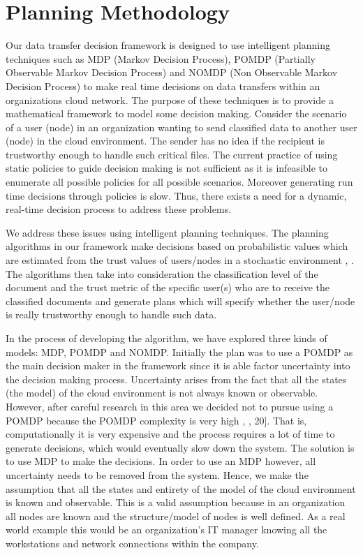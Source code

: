 \section{Planning Methodology}
Our data transfer decision framework is designed to use intelligent planning
techniques such as MDP (Markov Decision Process), POMDP (Partially Observable
Markov Decision Process) and NOMDP (Non Observable Markov Decision Process) to
make real time decisions on data transfers within an organizations cloud
network. The purpose of these techniques is to provide a mathematical framework
to model some decision making. Consider the scenario of a user (node) in an
organization wanting to send classified data to another user (node) in the cloud
environment. The sender has no idea if the recipient is trustworthy enough to
handle such critical files. The current practice of using static policies to
guide decision making is not sufficient as it is infeasible to enumerate all
possible policies for all possible scenarios. Moreover generating run time
decisions through policies is slow. Thus, there exists a need for a dynamic,
real-time decision process to address these problems. 

We address these issues using intelligent planning techniques. The planning
algorithms in our framework make decisions based on probabilistic values which
are estimated from the trust values of users/nodes in a stochastic environment
\autocite{JMarecki2012}, \autocite{JWu.2011}. The algorithms then take into consideration the classification level
of the document and the trust metric of the specific user(s) who are to receive
the classified documents and generate plans which will specify whether the
user/node is really trustworthy enough to handle such data.  

In the process of
developing the algorithm, we have explored three kinds of models: MDP, POMDP and
NOMDP. Initially the plan was to use a POMDP as the main decision maker in the
framework since it is able factor uncertainty into the decision making process.
Uncertainty arises from the fact that all the states (the model) of the cloud
environment is not always known or observable. However, after careful research
in this area we decided not to pursue using a POMDP because the POMDP complexity
is very high \autocite{LeslieP.Kaelbling1998}, \autocite{Zilberman}, 20]. 
That is, computationally it is very expensive and the
process requires a lot of time to generate decisions, which would eventually
slow down the system. The solution is to use MDP to make the decisions. In order
to use an MDP however, all uncertainty needs to be removed from the system.
Hence, we make the assumption that all the states and entirety of the model of
the cloud environment is known and observable. This is a valid assumption
because in an organization all nodes are known and the structure/model of nodes
is well defined. As a real world example this would be an organization’s IT
manager knowing all the workstations and network connections within the company.

